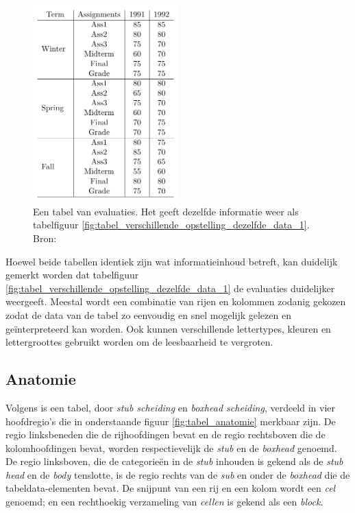 \begin{figure}[H]
    \centering
    \includegraphics[width=0.5\textwidth]{img/tabel_verschillende_opstelling_dezelfde_data_2.png}
    \caption{Een tabel van evaluaties. Het geeft dezelfde informatie weer als tabelfiguur \ref{fig:tabel_verschillende_opstelling_dezelfde_data_1}. Bron: \cite{Long2010}}
    \label{fig:tabel_verschillende_opstelling_dezelfde_data_2}
\end{figure}

Hoewel beide tabellen identiek zijn wat informatieinhoud betreft, kan duidelijk gemerkt worden dat tabelfiguur \ref{fig:tabel_verschillende_opstelling_dezelfde_data_1} de evaluaties duidelijker weergeeft. Meestal wordt een combinatie van rijen en kolommen zodanig gekozen zodat de data van de tabel zo eenvoudig en snel mogelijk gelezen en geïnterpreteerd kan worden. Ook kunnen verschillende lettertypes, kleuren en lettergroottes gebruikt worden om de leesbaarheid te vergroten.

\subsection{Anatomie}
\label{subsec:anatomie}

\raggedbottom

Volgens \textcite{Wang1996} is een tabel, door \textit{stub scheiding} en \textit{boxhead scheiding}, verdeeld in vier hoofdregio's die in onderstaande figuur \ref{fig:tabel_anatomie} merkbaar zijn. De regio linksbeneden die de rijhoofdingen bevat en de regio rechtsboven die de kolomhoofdingen bevat, worden respectievelijk de \textit{stub} en de \textit{boxhead} genoemd. De regio linksboven, die de categorieën in de \textit{stub} inhouden is gekend als de \textit{stub head} en de \textit{body} tenslotte, is de regio rechts van de \textit{sub} en onder de \textit{boxhead} die de tabeldata-elementen bevat. De snijpunt van een rij en een kolom wordt een \textit{cel} genoemd; en een rechthoekig verzameling van \textit{cellen} is gekend als een \textit{block}.

